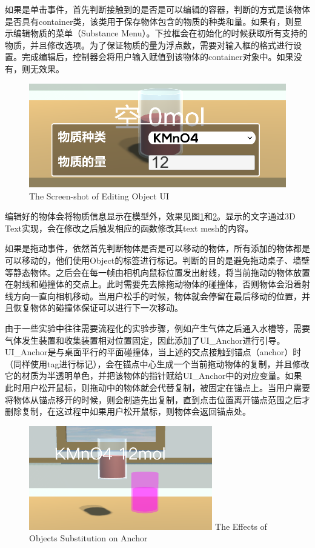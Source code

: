 	如果是单击事件，首先判断接触到的是否是可以编辑的容器，判断的方式是该物体是否具有container类，该类用于保存物体包含的物质的种类和量。如果有，则显示编辑物质的菜单（Substance Menu）。下拉框会在初始化的时候获取所有支持的物质，并且修改选项。为了保证物质的量为浮点数，需要对输入框的格式进行设置。完成编辑后，控制器会将用户输入赋值到该物体的container对象中。如果没有，则无效果。
	
\begin{figure}[!htp]
  \centering
  \includegraphics[width=12cm]{figure/subs.png}
    {The Screen-shot of Editing Object UI}
 \label{fig:subs}
\end{figure}

编辑好的物体会将物质信息显示在模型外，效果见图\ref{fig:subs}和\ref{fig:substi}。显示的文字通过3D Text实现，会在修改之后触发相应的函数修改其text mesh的内容。

如果是拖动事件，依然首先判断物体是否是可以移动的物体，所有添加的物体都是可以移动的，他们使用Object的标签进行标记。判断的目的是避免拖动桌子、墙壁等静态物体。之后会在每一帧由相机向鼠标位置发出射线，将当前拖动的物体放置在射线和碰撞体的交点上。此时需要先去除拖动物体的碰撞体，否则物体会沿着射线方向一直向相机移动。当用户松手的时候，物体就会停留在最后移动的位置，并且恢复物体的碰撞体保证可以进行下一次移动。

由于一些实验中往往需要流程化的实验步骤，例如产生气体之后通入水槽等，需要气体发生装置和收集装置相对位置固定，因此添加了UI\_Anchor进行引导。UI\_Anchor是与桌面平行的平面碰撞体，当上述的交点接触到锚点（anchor）时（同样使用tag进行标记），会在锚点中心生成一个当前拖动物体的复制，并且修改它的材质为半透明单色，并把该物体的指针赋给UI\_Anchor中的对应变量。如果此时用户松开鼠标，则拖动中的物体就会代替复制，被固定在锚点上。当用户需要将物体从锚点移开的时候，则会制造先出复制，直到点击位置离开锚点范围之后才删除复制，在这过程中如果用户松开鼠标，则物体会返回锚点处。
	
\begin{figure}[!htp]
  \centering
  \includegraphics[width=8cm]{figure/substi.png}
    {The Effects of Objects Substitution on Anchor}
 \label{fig:substi}
\end{figure}

